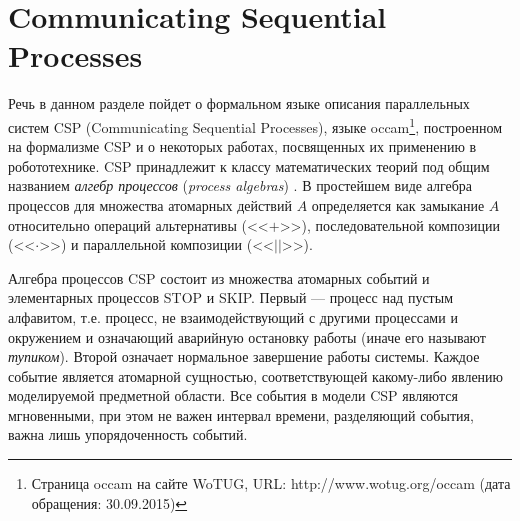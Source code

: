 \documentclass[a4, 14pt]{article}
\begin{document}
\section{Communicating Sequential Processes}
Речь в данном разделе пойдет о формальном языке описания параллельных систем CSP 
(Communicating Sequential Processes), языке 
occam\footnote{Страница occam на сайте WoTUG, URL: http://www.wotug.org/occam (дата обращения: 30.09.2015)}, 
построенном на формализме CSP и о некоторых работах, посвященных их применению 
в робототехнике. CSP принадлежит к классу математических теорий под общим 
названием \textit{алгебр процессов} (\textit{process algebras})
\cite{baeten2005brief, fokkink2013introduction}. В простейшем виде алгебра 
процессов для множества атомарных действий $A$ определяется как замыкание 
$A$ относительно операций альтернативы (<<$+$>>), последовательной 
композиции (<<$\cdot$>>) и параллельной композиции (<<$||$>>).

Алгебра процессов CSP состоит из множества атомарных событий и элементарных 
процессов STOP и SKIP. Первый --- процесс над пустым алфавитом, т.е. процесс, 
не взаимодействующий с другими процессами и окружением и означающий аварийную 
остановку работы (иначе его называют \textit{тупиком}). Второй означает 
нормальное завершение работы системы. Каждое событие является атомарной сущностью, 
соответствующей какому-либо явлению моделируемой предметной области. Все события 
в модели CSP являются мгновенными, при этом не важен интервал времени, 
разделяющий события, важна лишь упорядоченность событий.
\end{document}
